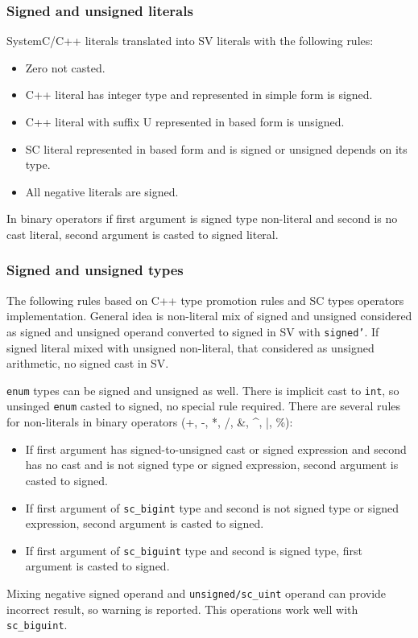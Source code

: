 \subsubsection{Signed and unsigned literals}

SystemC/C++ literals translated into SV literals with the following rules:
\begin{itemize}
\item Zero not casted.
\item C++ literal has integer type and represented in simple form is signed.
\item C++ literal with suffix U represented in based form is unsigned.
\item SC literal represented in based form and is signed or unsigned depends on its type.
\item All negative literals are signed.
\end{itemize}
In binary operators if first argument is signed type non-literal and second is no cast literal, second argument is casted to signed literal.

\subsubsection{Signed and unsigned types}

The following rules based on C++ type promotion rules and SC types operators implementation.
General idea is non-literal mix of signed and unsigned considered as signed and unsigned operand converted to signed in SV with {\tt signed'}. If signed literal mixed with unsigned non-literal, that considered as unsigned arithmetic, no signed cast in SV.

{\tt enum} types can be signed and unsigned as well. There is implicit cast to {\tt int}, so unsinged {\tt enum} casted to signed, no special rule required.
There are several rules for non-literals in binary operators (+, -, *, /, \&, \textasciicircum, |, \%):
%
\begin{itemize}
\item If first argument has signed-to-unsigned cast or signed expression and second has no cast and is not signed type or signed expression, second argument is casted to signed.
\item If first argument of {\tt sc\_bigint} type and second is not signed type or signed expression, second argument is casted to signed.
\item If first argument of {\tt sc\_biguint} type and second is signed type, first argument is casted to signed.
\end{itemize}
%
Mixing negative signed operand and {\tt unsigned/sc\_uint} operand can provide incorrect result, so warning is reported. This operations work well with {\tt sc\_biguint}.

